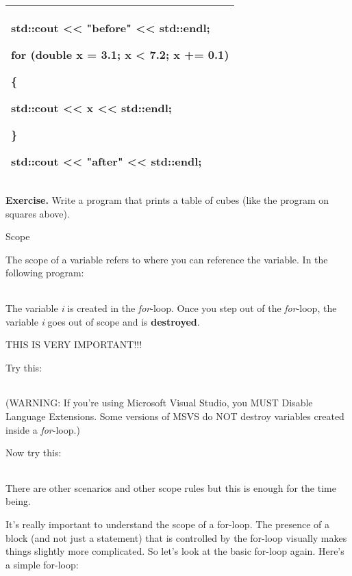 \documentclass[
]{article}
\begin{document}
\begin{longtable}[]{@{}l@{}}
\toprule
\endhead
\begin{minipage}[t]{0.97\columnwidth}\raggedright
std::cout \textless\textless{} "before" \textless\textless{} std::endl;

for (double x = 3.1; x \textless{} 7.2; x += 0.1)

\{

std::cout \textless\textless{} x \textless\textless{} std::endl;

\}

std::cout \textless\textless{} "after" \textless\textless{}
std::endl;\strut
\end{minipage}\tabularnewline
\bottomrule
\end{longtable}

\textbf{Exercise.} Write a program that prints a table of cubes (like
the program on squares above).

Scope

The scope of a variable refers to where you can reference the variable.
In the following program:

\begin{longtable}[]{@{}@{}}
\toprule
\endhead
\bottomrule
\end{longtable}

The variable \emph{i} is created in the \emph{for}-loop. Once you step
out of the \emph{for}-loop, the variable \emph{i} goes out of scope and
is \textbf{destroyed}.

THIS IS VERY IMPORTANT!!!

Try this:

\begin{longtable}[]{@{}@{}}
\toprule
\endhead
\bottomrule
\end{longtable}

(WARNING: If you're using Microsoft Visual Studio, you MUST Disable
Language Extensions. Some versions of MSVS do NOT destroy variables
created inside a \emph{for}-loop.)

Now try this:

\begin{longtable}[]{@{}@{}}
\toprule
\endhead
\bottomrule
\end{longtable}

There are other scenarios and other scope rules but this is enough for
the time being.

It's really important to understand the scope of a for-loop. The
presence of a block (and not just a statement) that is controlled by the
for-loop visually makes things slightly more complicated. So let's look
at the basic for-loop again. Here's a simple for-loop:
\end{document}
